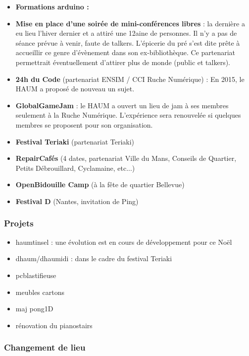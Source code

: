 \documentclass[11pt]{article}
\begin{document}
\begin{itemize}
    \item \textbf{Formations arduino : }
    \item \textbf{Mise en place d'une soirée de mini-conférences libres} : la dernière a eu lieu l'hiver dernier et a attiré une 12aine de personnes. Il n'y a pas de séance prévue à venir, faute de talkers. L'épicerie du pré s'est dite prête à accueillir ce genre d'évènement dans son ex-bibliothèque. Ce partenariat permettrait éventuellement d'attirer plus de monde (public et talkers).
    \item \textbf{24h du Code} (partenariat ENSIM / CCI Ruche Numérique) : En 2015, le HAUM a proposé de nouveau un sujet.
	\item \textbf{GlobalGameJam} : le HAUM a ouvert un lieu de jam à ses membres seulement à la Ruche Numérique. L'expérience sera renouvelée si quelques membres se proposent pour son organisation.
    \item \textbf{Festival Teriaki} (partenariat Teriaki)
	\item \textbf{RepairCafés} (4 dates, partenariat Ville du Mans, Conseils de Quartier, Petits Débrouillard, Cyclamaine, etc...)
	\item \textbf{OpenBidouille Camp} (à la fête de quartier Bellevue)
	\item \textbf{Festival D} (Nantes, invitation de Ping)
\end{itemize}

\subsubsection{Projets}
\label{ssec:projects}

\begin{itemize}
	\item haumtinsel : une évolution est en cours de développement pour ce Noël
	\item dhaum/dhaumidi : dans le cadre du festival Teriaki
	\item pcblastifieuse
	\item meubles cartons
	\item maj pong1D
	\item rénovation du pianostairs
\end{itemize} 

\subsubsection{Changement de lieu}
\end{document}
